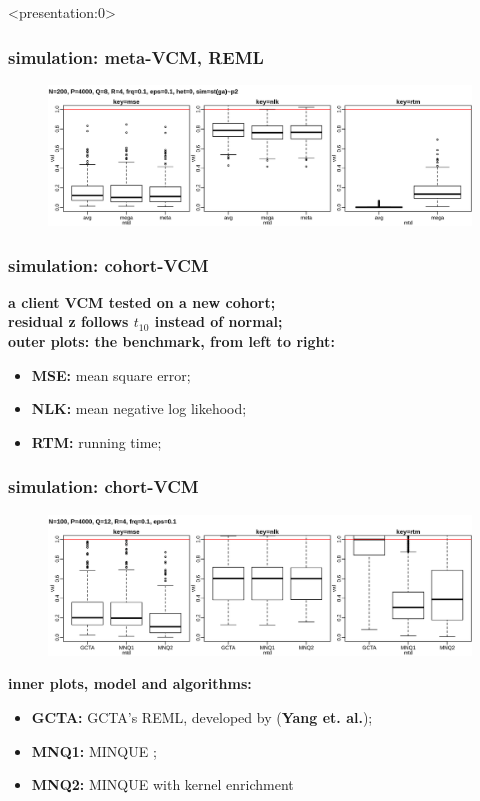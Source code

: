 \documentclass{beamer}
\begin{document}
\begin{frame} <presentation:0>%
  \frametitle{simulation: meta-VCM, REML} %
  \begin{figure}
    \centering \includegraphics[width=.95\linewidth]{img/met_hom_stt_gct_ssz}
  \end{figure}
\end{frame}
\begin{frame}\frametitle{simulation: cohort-VCM}
  \textbf{a client VCM tested on a new cohort;} \\
  \textbf{residual z follows $t_{10}$ instead of normal;} \\
  {\color{blue}\textbf{outer plots: the benchmark, from left to right:}}
  \begin{itemize}
  \item \textbf{MSE:} mean square error;
  \item \textbf{NLK:} mean negative log likehood;
  \item \textbf{RTM:} running time;
  \end{itemize}
\end{frame}
\begin{frame} \frametitle{simulation: chort-VCM}
  \begin{figure}
    \centering \includegraphics[width=.95\linewidth]{img/vcm_bmk_gau}
  \end{figure}
  {\color{blue}\textbf{inner plots, model and algorithms:}}
  \begin{itemize}
  \item \textbf{GCTA:} GCTA's REML, developed by (\textbf{Yang et. al.});
  \item \textbf{MNQ1:} MINQUE ;
  \item \textbf{MNQ2:} MINQUE with kernel enrichment
  \end{itemize}
\end{frame}
\end{document}
